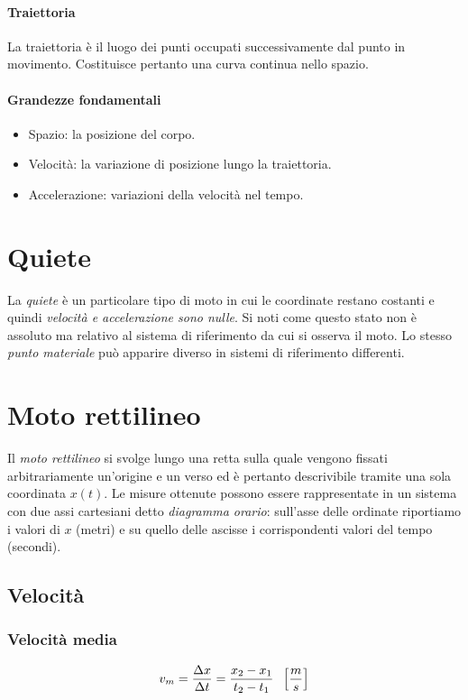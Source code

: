 \documentclass[class=book, crop=false, oneside, 12pt]{standalone}
\begin{document}
      \paragraph{Traiettoria}
      La traiettoria \`e il luogo dei punti occupati successivamente dal punto in movimento.
      Costituisce pertanto una curva continua nello spazio.
      \paragraph{Grandezze fondamentali}
      \begin{itemize}
        \item Spazio: la posizione del corpo.
        \item Velocit\`a: la variazione di posizione lungo la traiettoria.
        \item Accelerazione: variazioni della velocità nel tempo.
      \end{itemize}
\section{Quiete}
La \emph{quiete} è un particolare tipo di moto in cui le coordinate restano costanti e quindi \emph{velocità e accelerazione sono nulle}.
Si noti come questo stato non \`e assoluto ma relativo al sistema di riferimento da cui si osserva il moto.
Lo stesso \emph{punto materiale} può apparire diverso in sistemi di riferimento differenti.
\section{Moto rettilineo}
Il \emph{moto rettilineo} si svolge lungo una retta sulla quale vengono fissati arbitrariamente un'origine e un verso ed è pertanto descrivibile tramite una sola coordinata \(x(t)\).
Le misure ottenute possono essere rappresentate in un sistema con due assi cartesiani detto \emph{diagramma orario}: sull'asse delle ordinate riportiamo i valori di \(x\) (metri) e su quello delle ascisse i corrispondenti valori del tempo (secondi).


  \subsection{Velocità}
    \subsubsection{Velocit\`a media}
    \begin{equation}\label{velocita_media}
      v_m = \dfrac {\Delta x} {\Delta t} = \dfrac {x_2 - x_1} {t_2 - t_1} \hspace{0.2cm} \left[\dfrac {m} {s}\right]
    \end{equation}
\end{document}
